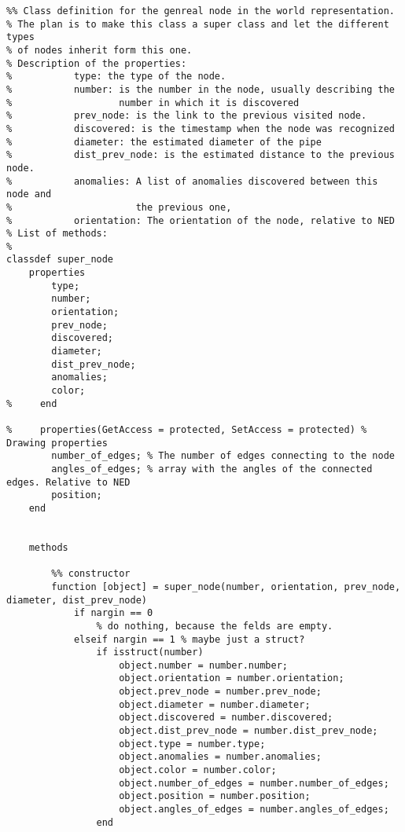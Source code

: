 \begin{lstlisting}
%% Class definition for the genreal node in the world representation. 
% The plan is to make this class a super class and let the different types
% of nodes inherit form this one.
% Description of the properties:
%           type: the type of the node.
%           number: is the number in the node, usually describing the
%                   number in which it is discovered
%           prev_node: is the link to the previous visited node.
%           discovered: is the timestamp when the node was recognized
%           diameter: the estimated diameter of the pipe
%           dist_prev_node: is the estimated distance to the previous node.
%           anomalies: A list of anomalies discovered between this node and
%                      the previous one,
%           orientation: The orientation of the node, relative to NED
% List of methods:
%           
classdef super_node
    properties
        type;
        number;
        orientation;
        prev_node;
        discovered;
        diameter;
        dist_prev_node;
        anomalies;
        color;
%     end
    
%     properties(GetAccess = protected, SetAccess = protected) % Drawing properties
        number_of_edges; % The number of edges connecting to the node
        angles_of_edges; % array with the angles of the connected edges. Relative to NED
        position;
    end
    
    
    methods
        
        %% constructor
        function [object] = super_node(number, orientation, prev_node, diameter, dist_prev_node)
            if nargin == 0 
                % do nothing, because the felds are empty.
            elseif nargin == 1 % maybe just a struct?
                if isstruct(number)
                    object.number = number.number;
                    object.orientation = number.orientation;
                    object.prev_node = number.prev_node;
                    object.diameter = number.diameter;
                    object.discovered = number.discovered;
                    object.dist_prev_node = number.dist_prev_node;
                    object.type = number.type;
                    object.anomalies = number.anomalies;
                    object.color = number.color;
                    object.number_of_edges = number.number_of_edges;
                    object.position = number.position;
                    object.angles_of_edges = number.angles_of_edges;
                end
                    

\end{lstlisting}
